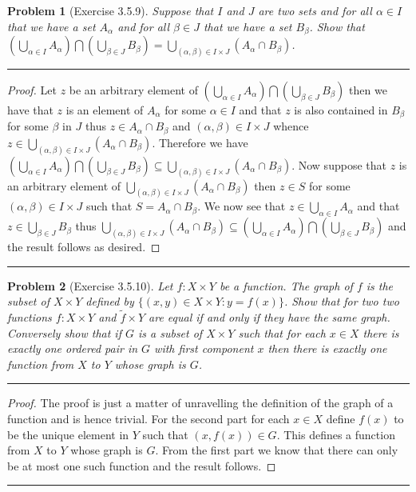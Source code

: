 \documentclass{article}
\newcommand{\lined}{\noindent\rule{\textwidth}{1pt}}
\newtheorem*{problem}{Problem}
\begin{document}
	\newpage
	
	\begin{problem}[Exercise 3.5.9]
		Suppose that $I$ and $J$ are two sets and for all $\alpha \in I$ that we have a set $A_{\alpha}$ and for all $\beta \in J$ that we have a set $B_{\beta}$. Show that $(\bigcup_{\alpha \in I}A_{\alpha}) \bigcap (\bigcup_{\beta \in J}B_{\beta}) = 
		\bigcup_{(\alpha,\beta) \in I \times J}(A_{\alpha} \cap B_{\beta})$.
	\end{problem}
	
	\lined
	\begin{proof}
		Let $z$ be an arbitrary element of $(\bigcup_{\alpha \in I}A_{\alpha}) \bigcap (\bigcup_{\beta \in J}B_{\beta})$ then we have that 
		$z$ is an element of $A_{\alpha}$ for some $\alpha \in I$ and that $z$ is also contained in $B_{\beta}$ for some $\beta$ in $J$ thus $z \in A_{\alpha} \cap B_{\beta}$ and $(\alpha,\beta) \in I \times J$ whence $z \in \bigcup_{(\alpha,\beta) \in I \times J}(A_{\alpha} \cap B_{\beta})$. Therefore we have $(\bigcup_{\alpha \in I}A_{\alpha}) \bigcap (\bigcup_{\beta \in J}B_{\beta}) \subseteq	\bigcup_{(\alpha,\beta) \in I \times J}(A_{\alpha} \cap B_{\beta})$. Now suppose that $z$ is an arbitrary element of
		$\bigcup_{(\alpha,\beta) \in I \times J}(A_{\alpha} \cap B_{\beta})$ then $z \in S$ for some $(\alpha,\beta) \in I \times J$ such
		that $S = A_{\alpha} \cap B_{\beta}$. We now see that $z \in \bigcup_{\alpha \in I} A_{\alpha}$ and that $z \in \bigcup_{\beta \in J} B_{\beta}$ thus $\bigcup_{(\alpha,\beta) \in I \times J}(A_{\alpha} \cap B_{\beta}) \subseteq (\bigcup_{\alpha \in I}A_{\alpha}) \bigcap (\bigcup_{\beta \in J}B_{\beta})$ and the result follows as desired.
		
	\end{proof}
	\lined
	
	\newpage
	
	\begin{problem}[Exercise 3.5.10]
		Let $f:X \times Y$ be a function. The graph of $f$
		is the subset of $X \times Y$ defined by 
		$\{(x,y) \in X \times Y:y = f(x)\}$. Show that for two 
		two functions $f:X \times Y$ and $\tilde{f} \times Y
		$ are equal if and only if they have the same graph.
		Conversely show that if $G$ is a subset of $X \times Y$ such that for each $x \in X$ there is exactly one ordered pair in $G$ with first component $x$ then there is exactly one function from $X$ to $Y$ whose graph is $G$.
	\end{problem}
	
	\lined
		\begin{proof}
			The proof is just a matter of unravelling the
			definition of the graph of a function and is hence 
			trivial. For the second part for each $x \in X$ define $f(x)$ to be the unique element in $Y$ such that
			$(x,f(x)) \in G$. This defines a function from $X$ to $Y$ whose graph is $G$. From the first part we know that there can only be at most one such function and the result follows.
		\end{proof}
	\lined
	
\end{document}
